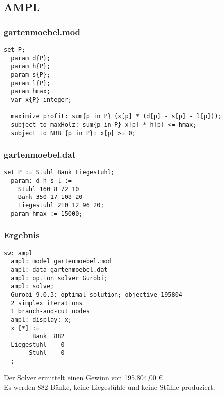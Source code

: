 \documentclass[a4paper,11pt]{article}
\begin{document}
\subsection*{AMPL}

\subsubsection*{gartenmoebel.mod}

\begin{lstlisting}[]
  set P;
  param d{P};
  param h{P};
  param s{P};
  param l{P};
  param hmax;
  var x{P} integer;

  maximize profit: sum{p in P} (x[p] * (d[p] - s[p] - l[p]));
  subject to maxHolz: sum{p in P} x[p] * h[p] <= hmax;
  subject to NBB {p in P}: x[p] >= 0;
\end{lstlisting}
\vspace{10mm}

\pagebreak

\subsubsection*{gartenmoebel.dat}

\begin{lstlisting}[]
  set P := Stuhl Bank Liegestuhl;
  param: d h s l := 
    Stuhl 160 8 72 10
    Bank 350 17 108 20
    Liegestuhl 210 12 96 20;
  param hmax := 15000;
\end{lstlisting}
\vspace{10mm}

\subsubsection*{Ergebnis}

\begin{lstlisting}[]
  sw: ampl
  ampl: model gartenmoebel.mod
  ampl: data gartenmoebel.dat
  ampl: option solver Gurobi;
  ampl: solve;
  Gurobi 9.0.3: optimal solution; objective 195804
  2 simplex iterations
  1 branch-and-cut nodes
  ampl: display: x;
  x [*] :=
        Bank  882
  Liegestuhl    0
       Stuhl    0
  ;
\end{lstlisting}
\vspace{10mm}

Der Solver ermittelt einen Gewinn von 195.804,00 € \\
Es werden 882 Bänke, keine Liegestühle und keine Stühle produziert. \\
\end{document}
